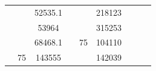 \begin{table}[]
\begin{tabular}{|cccccclll}
\multicolumn{1}{|c|}{\cellcolor[HTML]{FFFFC7}}                                & \multicolumn{1}{c|}{\cellcolor[HTML]{DAE8FC}}                      & \multicolumn{1}{c|}{\cellcolor[HTML]{DAE8FC}52535.1}   & \multicolumn{1}{c|}{\cellcolor[HTML]{FFFFC7}}                                & \multicolumn{1}{c|}{\cellcolor[HTML]{DAE8FC}}                       & \multicolumn{1}{c|}{\cellcolor[HTML]{DDFDFF}218123}    &                                                                              &                                                                    &                                                        \\ \cline{3-3} \cline{6-6}
\multicolumn{1}{|c|}{\cellcolor[HTML]{FFFFC7}}                                & \multicolumn{1}{c|}{\cellcolor[HTML]{DAE8FC}}                      & \multicolumn{1}{c|}{\cellcolor[HTML]{DDFDFF}53964}     & \multicolumn{1}{c|}{\cellcolor[HTML]{FFFFC7}}                                & \multicolumn{1}{c|}{\cellcolor[HTML]{DAE8FC}}                       & \multicolumn{1}{c|}{\cellcolor[HTML]{DAE8FC}315253}    &                                                                              &                                                                    &                                                        \\ \cline{3-3} \cline{6-6}
\multicolumn{1}{|c|}{\cellcolor[HTML]{FFFFC7}}                                & \multicolumn{1}{c|}{\cellcolor[HTML]{DAE8FC}}                      & \multicolumn{1}{c|}{\cellcolor[HTML]{DAE8FC}68468.1}   & \multicolumn{1}{c|}{\cellcolor[HTML]{FFFFC7}}                                & \multicolumn{1}{c|}{\multirow{-10}{*}{\cellcolor[HTML]{DAE8FC}75}}  & \multicolumn{1}{c|}{\cellcolor[HTML]{DDFDFF}104110}    &                                                                              &                                                                    &                                                        \\ \cline{3-3} \cline{5-6}
\multicolumn{1}{|c|}{\cellcolor[HTML]{FFFFC7}}                                & \multicolumn{1}{c|}{\multirow{-10}{*}{\cellcolor[HTML]{DAE8FC}75}} & \multicolumn{1}{c|}{\cellcolor[HTML]{DDFDFF}143555}    & \multicolumn{1}{c|}{\cellcolor[HTML]{FFFFC7}}                                & \multicolumn{1}{c|}{\cellcolor[HTML]{DDFDFF}}                       & \multicolumn{1}{c|}{\cellcolor[HTML]{DAE8FC}142039}    &                                                                              &                                                                    &                                                        \\ \cline{2-3} \cline{6-6}

\end{tabular}
\end{table}
